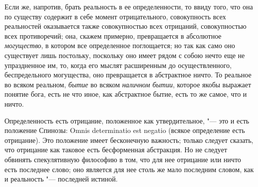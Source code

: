 Если же, напротив, брать реальность в ее определенности, то ввиду того, что
она по существу содержит в себе момент отрицательного, совокупность всех
реальностей оказывается также совокупностью всех отрицаний, совокупностью
всех противоречий; она, скажем примерно, превращается в абсолютное
{\em могущество}, в котором все определенное
поглощается; но так как само оно существует лишь постольку, поскольку оно
имеет рядом с собою нечто еще не упраздненное им, то, когда его мыслят
расширенным до осуществленного, беспредельного могущества, оно превращается
в абстрактное ничто. То реальное во всяком реальном,
{\em бытие} во всяком {\em наличном
бытии}, которое якобы выражает понятие бога, есть не что иное, как
абстрактное бытие, есть то же самое, что и ничто.

Определенность есть отрицание, положенное как утвердительное, "--- это и есть
положение Спинозы: Omnis determinatio est negatio (всякое определение есть
отрицание). Это положение имеет
бесконечную важность; только следует сказать, что отрицание как таковое
есть бесформенная абстракция. Но не следует обвинять спекулятивную
философию в том, что для нее отрицание или ничто есть последнее слово; оно
является для нее столь же мало последним словом, как и реальность
"--- последней истиной.

